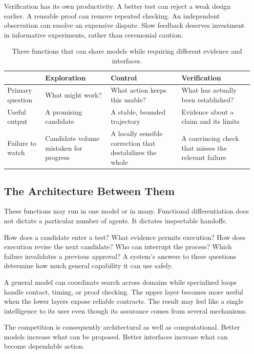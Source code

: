Verification has its own productivity. A better test can reject a weak design earlier. A reusable proof can remove repeated checking. An independent observation can resolve an expensive dispute. Slow feedback deserves investment in informative experiments, rather than ceremonial caution.

\begin{table}[ht]
\centering\small
\begin{tabularx}{\textwidth}{@{}lYYY@{}}
\toprule
& Exploration & Control & Verification\\
\midrule
Primary question & What might work? & What action keeps this usable? & What has actually been established?\\
Useful output & A promising candidate & A stable, bounded trajectory & Evidence about a claim and its limits\\
Failure to watch & Candidate volume mistaken for progress & A locally sensible correction that destabilizes the whole & A convincing check that misses the relevant failure\\
\bottomrule
\end{tabularx}
\caption{Three functions that can share models while requiring different evidence and interfaces.}
\end{table}

\subsection{The Architecture Between Them}

These functions may run in one model or in many. Functional differentiation does not dictate a particular number of agents. It dictates inspectable handoffs.

How does a candidate enter a test? What evidence permits execution? How does execution revise the next candidate? Who can interrupt the process? Which failure invalidates a previous approval? A system's answers to these questions determine how much general capability it can use safely.

A general model can coordinate search across domains while specialized loops handle contact, timing, or proof checking. The upper layer becomes more useful when the lower layers expose reliable contracts. The result may feel like a single intelligence to its user even though its assurance comes from several mechanisms.

The competition is consequently architectural as well as computational. Better models increase what can be proposed. Better interfaces increase what can become dependable action.
